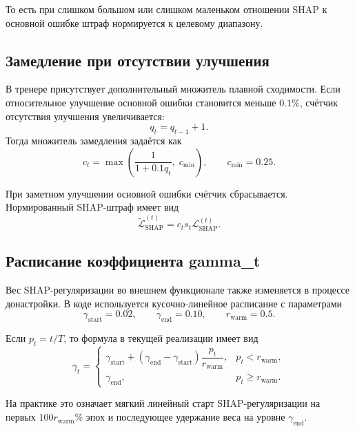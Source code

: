 \documentclass[11pt]{article}
\begin{document}
То есть при слишком большом или слишком маленьком отношении SHAP к основной ошибке штраф нормируется к целевому диапазону.

\subsection{Замедление при отсутствии улучшения}

В тренере присутствует дополнительный множитель плавной сходимости. Если относительное улучшение основной ошибки становится меньше $0.1\%$, счётчик отсутствия улучшения увеличивается:
\begin{equation}
 q_t = q_{t-1} + 1.
\end{equation}
Тогда множитель замедления задаётся как
\begin{equation}
 c_t = \max\!\left(\frac{1}{1 + 0.1 q_t},\; c_{\min}\right),
 \qquad
 c_{\min} = 0.25.
\end{equation}

При заметном улучшении основной ошибки счётчик сбрасывается. Нормированный SHAP-штраф имеет вид
\begin{equation}
\widetilde{\mathcal{L}}_{\mathrm{SHAP}}^{(t)} = c_t s_t \mathcal{L}_{\mathrm{SHAP}}^{(t)}.
\end{equation}

\subsection{Расписание коэффициента gamma\_t}

Вес SHAP-регуляризации во внешнем функционале также изменяется в процессе донастройки. В коде используется кусочно-линейное расписание с параметрами
\begin{equation}
\gamma_{\mathrm{start}} = 0.02,
\qquad
\gamma_{\mathrm{end}} = 0.10,
\qquad
r_{\mathrm{warm}} = 0.5.
\end{equation}

Если $p_t = t/T$, то формула в текущей реализации имеет вид
\begin{equation}
\gamma_t =
\begin{cases}
\gamma_{\mathrm{start}} + (\gamma_{\mathrm{end}} - \gamma_{\mathrm{start}})\dfrac{p_t}{r_{\mathrm{warm}}}, & p_t < r_{\mathrm{warm}},\\[8pt]
\gamma_{\mathrm{end}}, & p_t \ge r_{\mathrm{warm}}.
\end{cases}
\end{equation}

На практике это означает мягкий линейный старт SHAP-регуляризации на первых $100r_{\mathrm{warm}}\%$ эпох и последующее удержание веса на уровне $\gamma_{\mathrm{end}}$.
\end{document}

